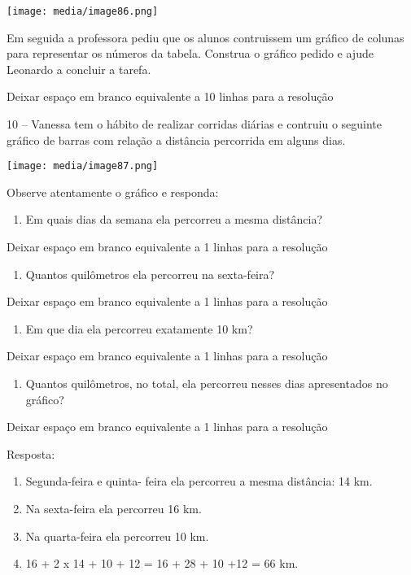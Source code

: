 \texttt{[image: media/image86.png]}

Em seguida a professora pediu que os alunos contruissem um gráfico de
colunas para representar os números da tabela. Construa o gráfico pedido
e ajude Leonardo a concluir a tarefa.

Deixar espaço em branco equivalente a 10 linhas para a resolução

10 -- Vanessa tem o hábito de realizar corridas diárias e contruiu o
seguinte gráfico de barras com relação a distância percorrida em alguns
dias.

\texttt{[image: media/image87.png]}

Observe atentamente o gráfico e responda:

\begin{enumerate}
\def\labelenumi{\alph{enumi})}
\item
  Em quais dias da semana ela percorreu a mesma distância?
\end{enumerate}

Deixar espaço em branco equivalente a 1 linhas para a resolução

\begin{enumerate}
\def\labelenumi{\alph{enumi})}
\item
  Quantos quilômetros ela percorreu na sexta-feira?
\end{enumerate}

Deixar espaço em branco equivalente a 1 linhas para a resolução

\begin{enumerate}
\def\labelenumi{\alph{enumi})}
\item
  Em que dia ela percorreu exatamente 10 km?
\end{enumerate}

Deixar espaço em branco equivalente a 1 linhas para a resolução

\begin{enumerate}
\def\labelenumi{\alph{enumi})}
\item
  Quantos quilômetros, no total, ela percorreu nesses dias apresentados
  no gráfico?
\end{enumerate}

Deixar espaço em branco equivalente a 1 linhas para a resolução

Resposta:

\begin{enumerate}
\def\labelenumi{\alph{enumi})}
\item
  Segunda-feira e quinta- feira ela percorreu a mesma distância: 14 km.
\item
  Na sexta-feira ela percorreu 16 km.
\item
  Na quarta-feira ela percorreu 10 km.
\item
  16 + 2 x 14 + 10 + 12 = 16 + 28 + 10 +12 = 66 km.
\end{enumerate}

